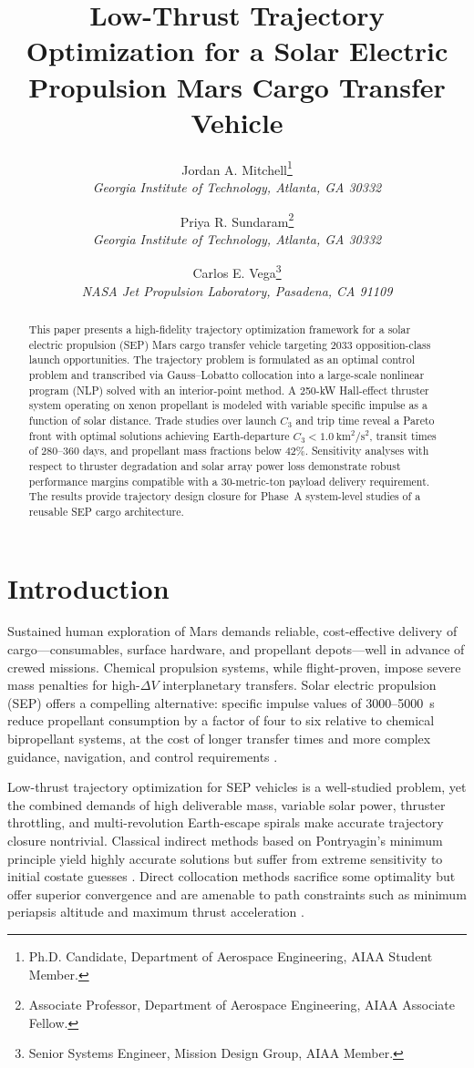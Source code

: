 \documentclass{aiaa-tc}
\title{Low-Thrust Trajectory Optimization for a Solar Electric Propulsion
       Mars Cargo Transfer Vehicle}
\author{
  Jordan A. Mitchell\thanks{Ph.D. Candidate, Department of Aerospace Engineering, AIAA Student Member.}\\
  {\normalsize\itshape Georgia Institute of Technology, Atlanta, GA 30332}
  \and
  Priya R. Sundaram\thanks{Associate Professor, Department of Aerospace Engineering, AIAA Associate Fellow.}\\
  {\normalsize\itshape Georgia Institute of Technology, Atlanta, GA 30332}
  \and
  Carlos E. Vega\thanks{Senior Systems Engineer, Mission Design Group, AIAA Member.}\\
  {\normalsize\itshape NASA Jet Propulsion Laboratory, Pasadena, CA 91109}
}
\begin{document}
\maketitle

\begin{abstract}
This paper presents a high-fidelity trajectory optimization framework for a
solar electric propulsion (SEP) Mars cargo transfer vehicle targeting 2033
opposition-class launch opportunities.  The trajectory problem is formulated
as an optimal control problem and transcribed via Gauss–Lobatto collocation
into a large-scale nonlinear program (NLP) solved with an interior-point
method.  A 250-kW Hall-effect thruster system operating on xenon propellant
is modeled with variable specific impulse as a function of solar distance.
Trade studies over launch $C_3$ and trip time reveal a Pareto front with
optimal solutions achieving Earth-departure $C_3 < 1.0~\text{km}^2/\text{s}^2$,
transit times of 280–360 days, and propellant mass fractions below 42\%.
Sensitivity analyses with respect to thruster degradation and solar array
power loss demonstrate robust performance margins compatible with a 30-metric-ton
payload delivery requirement.  The results provide trajectory design closure
for Phase~A system-level studies of a reusable SEP cargo architecture.
\end{abstract}

\section{Introduction}
\label{sec:intro}

Sustained human exploration of Mars demands reliable, cost-effective delivery
of cargo—consumables, surface hardware, and propellant depots—well in advance
of crewed missions.  Chemical propulsion systems, while flight-proven, impose
severe mass penalties for high-$\Delta V$ interplanetary transfers.  Solar
electric propulsion (SEP) offers a compelling alternative: specific impulse
values of 3000–5000~s reduce propellant consumption by a factor of four to
six relative to chemical bipropellant systems, at the cost of longer transfer
times and more complex guidance, navigation, and control requirements
\cite{raghavendra2019,brophy2012}.

Low-thrust trajectory optimization for SEP vehicles is a well-studied problem,
yet the combined demands of high deliverable mass, variable solar power,
thruster throttling, and multi-revolution Earth-escape spirals make accurate
trajectory closure nontrivial.  Classical indirect methods based on Pontryagin's
minimum principle yield highly accurate solutions but suffer from extreme
sensitivity to initial costate guesses \cite{bryson1975}.  Direct collocation
methods sacrifice some optimality but offer superior convergence and are
amenable to path constraints such as minimum periapsis altitude and maximum
thrust acceleration \cite{betts1998,longuski2014}.
\end{document}
